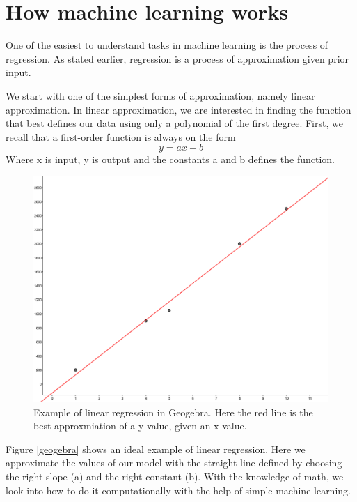     
\section{How machine learning works}   
One of the easiest to understand tasks in machine learning is the process of regression. As stated earlier, regression is a process of approximation given prior input.

We start with one of the simplest forms of approximation, namely linear approximation. In linear approximation, we are interested in finding the function that best defines our data using only a polynomial of the first degree.  First, we recall that a first-order function is always on the form
\begin{equation}
y = ax +b 
\end{equation}
Where x is input, y is output and the constants a and b  defines the function.
    
\begin{figure}
\centering
\includegraphics[scale=0.05]{background/figures/linear_regression.png}
\caption{Example of linear regression in Geogebra. Here the red line is the best approxmiation of a y value, given an x value.} 
\label{fig:geogebra}
\end{figure} %

Figure \ref{geogebra} shows an ideal example of linear regression. Here we approximate the values of our model with the straight line defined by choosing the right slope (a) and the right constant (b).
With the knowledge of math, we look into how to do it computationally with the help of simple machine learning. 

